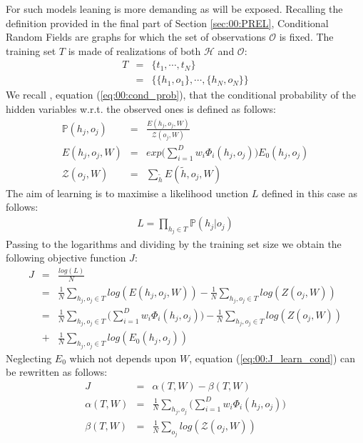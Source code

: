 For such models leaning is more demanding as will be exposed.
Recalling the definition provided in the final part of Section \ref{sec:00:PREL}, Conditional Random Fields are graphs for which the set of observations $\mathcal{O}$ is fixed. The training set $T$ is made of realizations of both $\mathcal{H}$ and $\mathcal{O}$:
\begin{eqnarray}
T &=& \lbrace t_1, \cdots ,t_N \rbrace \nonumber\\ 
 &=& \lbrace \lbrace h_1, o_1 \rbrace , \cdots , \lbrace h_N, o_N \rbrace \rbrace
\end{eqnarray}
We recall , equation (\ref{eq:00:cond_prob}), that the conditional probability of the hidden variables w.r.t. the observed ones is defined as follows:
\begin{eqnarray}
\mathbb{P}(h_j, o_j) &=& \frac{E(h_j, o_j, W)}{\mathcal{Z}(o_j, W)} \nonumber\\
E(h_j, o_j, W) &=& exp \big( \sum_{i=1}^{D} w_i \Phi_i(h_j, o_j) \big) E_0(h_j, o_j) \nonumber\\
\mathcal{Z}(o_j, W) &=& \sum_{\tilde{h}} E(\tilde{h}, o_j, W)
\end{eqnarray}
The aim of learning is to maximise a likelihood  unction $L$ defined in this case as follows:
\begin{eqnarray}
L = \prod_{h_j \in T} \mathbb{P}(h_j | o_j) 
\end{eqnarray}
Passing to the logarithms and dividing by the training set size we obtain the following objective function $J$:
\begin{eqnarray}
J &=& \frac{log(L)}{N} \nonumber\\
 &=& \frac{1}{N} \sum_{h_j, o_j \in T} log(E(h_j, o_j, W)) -
\frac{1}{N} \sum_{h_j, o_j \in T}log(Z(o_j, W)) \nonumber\\
 &=& \frac{1}{N} \sum_{h_j, o_j \in T} \big( \sum_{i=1}^{D}w_i \Phi_i (h_j, o_j) \big) -
\frac{1}{N} \sum_{h_j, o_j \in T}log(Z(o_j, W))  \nonumber\\
 &+& \frac{1}{N} \sum_{h_j, o_j \in T} log(E_0(h_j, o_j)) 
\label{eq:00:J_learn_cond}
\end{eqnarray}
Neglecting $E_0$ which not depends upon $W$, equation (\ref{eq:00:J_learn_cond}) can be rewritten as follows:
\begin{eqnarray}
J &=& \alpha(T,W) - \beta(T,W) \nonumber\\
\alpha(T,W) &=& \frac{1}{N} \sum_{h_j, o_j} \big( \sum_{i=1}^D w_i \Phi_i(h_j, o_j) \big) \nonumber\\
\beta(T,W) &=& \frac{1}{N} \sum_{o_j} log(\mathcal{Z}(o_j,W))
\end{eqnarray}

